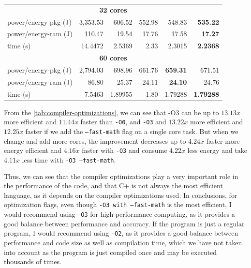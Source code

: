 \begin{table}
\begin{tabular}{lrrrrr}
    \midrule
    \multicolumn{6}{c}{\textbf{32 cores}} \\
    power/energy-pkg (J) & 3,353.53  & 606.52   & 552.98   &     548.83  & \textbf{535.22} \\
    power/energy-ram (J) & 110.47    & 19.54    & 17.76    &     17.58   & \textbf{17.27}  \\
    time (s)             & 14.4472   & 2.5369   & 2.33     &     2.3015  & \textbf{2.2368} \\
    \midrule
    \multicolumn{6}{c}{\textbf{60 cores}} \\
    power/energy-pkg (J) & 2,794.03  & 698.96   & 661.76   & \textbf{659.31} & 671.51         \\
    power/energy-ram (J) & 86.80     & 25.37    & 24.11    & \textbf{24.10}  & 24.76          \\
    time (s)             & 7.5463    & 1.89955  & 1.80     &     1.79288     & \textbf{1.79288}\\
    \bottomrule
  \end{tabular}
\end{table}


From the \autoref{tab:compiler-optimizations}, we can see that -O3 can be up to $13.13x$ more efficient and $11.44x$ faster than \texttt{-O0}, and \texttt{-O3} and $13.22x$ more efficient and $12.25x$ faster if we add the \texttt{--fast-math} flag on a single core task. But when we change and add more cores, the improvement decreases up to $4.24x$ faster more energy efficient and $4.16x$ faster with \texttt{-O3} and consume $4.22x$ less energy and take $4.11x$ less time with \texttt{-O3 --fast-math}.

Thus, we can see that the compiler optimizations play a very important role in the performance of the code, and that C\++ is not always the most efficient language, as it depends on the compiler optimizations used. In conclusions, for optimization flags, even though \texttt{-O3 with --fast-math} is the most efficient, I would recommend using \texttt{-O3} for high-performance computing, as it provides a good balance between performance and accuracy. If the program is just a regular program, I would recommend using \texttt{-O2}, as it provides a good balance between performance and code size as well as compilation time, which we have not taken into account as the program is just compiled once and may be executed thousands of times.